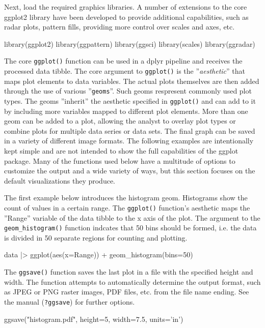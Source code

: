 \begin{withcode}
\noindent Next, load the required graphics libraries. A number of extensions to the core ggplot2 library have been developed to provide additional capabilities, such as radar plots, pattern fills, providing more control over scales and axes, etc.

\begin{Rcode}
library(ggplot2)
library(ggpattern)
library(ggsci)
library(scales)
library(ggradar)
\end{Rcode}

The core \texttt{ggplot()} function can be used in a dplyr pipeline and receives the processed data tibble. The core argument to \texttt{ggplot()} is the ''\emph{aesthetic}'' that maps plot elements to data variables. The actual plots themselves are then added through the use of various ''\texttt{geoms}''. Such geoms respresent commonly used plot types. The geoms ''inherit'' the aesthetic specified in \texttt{ggplot()} and can add to it by including more variables mapped to different plot elements. More than one geom can be added to a plot, allowing the analyst to overlay plot types or combine plots for multiple data series or data sets. The final graph can be saved in a variety of different image formats. The following examples are intentionally kept simple and are not intended to show the full capabilities of the ggplot package. Many of the functions used below have a multitude of options to customize the output and a wide variety of ways, but this section focuses on the default visualizations they produce.

The first example below introduces the histogram geom. Histograms show the count of values in a certain range. The \texttt{ggplot()} function's aesthetic maps the ''Range'' variable of the data tibble to the x axis of the plot. The argument to the \texttt{geom\_histogram()} function indcates that 50 bins should be formed, i.e. the data is divided in 50 separate regions for counting and plotting.

\begin{Rcode}
data |> 
  ggplot(aes(x=Range)) + 
    geom_histogram(bins=50)
\end{Rcode}

The \texttt{ggsave()} function saves the last plot in a file with the specified height and width. The function attempts to automatically determine the output format, such as JPEG or PNG raster images, PDF files, etc. from the file name ending. See the manual (\texttt{?ggsave}) for further options. 

\begin{Rcode}
ggsave("histogram.pdf", height=5, width=7.5, units='in')
\end{Rcode}


\end{withcode}

